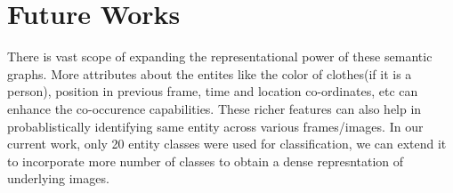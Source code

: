 \documentclass[conference]{IEEEtran}
\begin{document}
\section{Future Works}
There is vast scope of expanding the representational power of these semantic graphs. More attributes about the entites like the color of clothes(if it is a person), position in previous frame, time and location co-ordinates, etc can enhance the co-occurence capabilities. These richer features can also help in probablistically identifying same entity across various frames/images. In our current work, only 20 entity classes were used for classification, we can extend it to incorporate more number of classes to obtain a dense represntation of underlying images.
%
%



%
%
\end{document}
